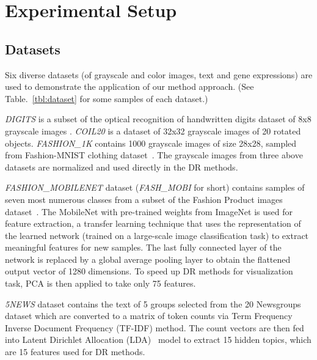 \section{Experimental Setup}\label{sec:xp:setup}


\subsection{Datasets}\label{sec:xp:data}

Six diverse datasets (of grayscale and color images, text and gene expressions) are used to demonstrate the application of our method approach. (See Table.~\ref{tbl:dataset} for some samples of each dataset.)

\emph{DIGITS} is a subset of the optical recognition of handwritten digits dataset of 8x8 grayscale images \cite{kaynak1995methods}.
\emph{COIL20} \cite{nene1996} is a dataset of 32x32 grayscale images of 20 rotated objects.
\emph{FASHION\_1K} contains 1000 grayscale images of size 28x28, sampled from Fashion-MNIST clothing dataset~\cite{xiao2017/online}.
The grayscale images from three above datasets are normalized and used directly in the DR methods.

\emph{FASHION\_MOBILENET} dataset (\emph{FASH\_MOBI} for short) contains samples of seven most numerous classes from a subset of the Fashion Product images dataset~\cite{fashionproduct}.
The MobileNet\cite{howard2017mobilenets} with pre-trained weights from ImageNet is used for feature extraction, a transfer learning technique that uses the representation of the learned network (trained on a large-scale image classification task) to extract meaningful features for new samples.
The last fully connected layer of the network is replaced by a global average pooling layer\cite[Sec.3.2]{lin2013network} to obtain the flattened output vector of 1280 dimensions.
To speed up DR methods for visualization task, PCA is then applied to take only 75 features.

\emph{5NEWS} dataset contains the text of 5 groups selected from the 20 Newsgroups dataset which are converted to a matrix of token counts via Term Frequency Inverse Document Frequency (TF-IDF) method.
The count vectors are then fed into Latent Dirichlet Allocation (LDA)~\cite{blei2003latent} model to extract 15 hidden topics, which are 15 features used for DR methods.

